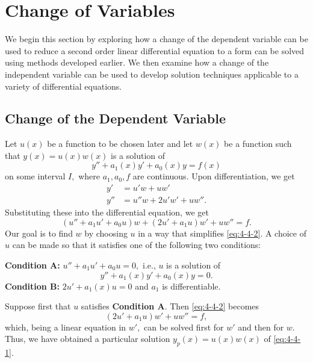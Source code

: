 	\section{Change of  Variables} \label{sec:change-of-variables}



We begin this section by exploring how a change of the dependent variable can be used to reduce a second order linear differential equation to a  form  can  be solved using methods developed earlier. We then examine how a change of the independent variable can be used to develop  solution techniques applicable to a variety of differential equations.

\subsection{Change of the Dependent Variable}
Let \(u(x)\) be a function to be chosen later and let $w(x)$ be a function such that \( y(x) = u(x) w(x)\) is a solution of
\begin{equation}\label{eq:4-4-1}
	y''+ a_1(x) y' + a_0(x)y = f(x)
\end{equation}
 on some interval $I,$ where  $a_1, a_0, f$ are continuous. Upon differentiation, we get
\[
\begin{split}
	y' &= u'w+uw'\\
	y''&=u''w+2u'w'+uw''.
\end{split}
\]
Substituting these into the differential equation, we get
\begin{equation}\label{eq:4-4-2}
	(u''+a_1u'+a_0u)w + (2u'+a_1u)w'+ uw'' = f.
	\end{equation}
Our goal  is to find $w$ by choosing $u$ in a way that simplifies \eqref{eq:4-4-2}. A choice of \( u \) can be made so that it satisfies one of the following two conditions:

\noindent \textbf{Condition A:} \(u''+ a_1 u' + a_0u=0,\) i.e., \(u\) is a solution of \begin{equation}\label{eq:4-4-3}
		y''+ a_1(x) y' + a_0(x)y = 0.
	\end{equation}
\noindent \textbf{Condition B:} \(2u'+a_1(x)u=0\) and  $a_1$ is differentiable.

Suppose first that \(u\) satisfies \textbf{Condition A}. Then \eqref{eq:4-4-2} becomes
\begin{equation}\label{eq:4-4-4}
	(2u'+a_1u)w'+ uw'' = f,
	\end{equation} which, being a linear equation in \(w',\) can be solved first for $w'$ and then for $w.$ Thus, we have obtained a particular solution $y_p(x) = u(x) w(x)$ of \eqref{eq:4-4-1}.

